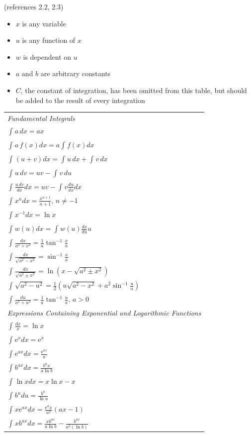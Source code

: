 \documentclass[
]{book}
\providecommand{\tightlist}{%
  \setlength{\itemsep}{0pt}\setlength{\parskip}{0pt}}
\begin{document}
(references 2.2, 2.3)

\begin{itemize}
\tightlist
\item
  \(x\) is any variable
\item
  \(u\) is any function of \(x\)
\item
  \(w\) is dependent on \(u\)
\item
  \(a\) and \(b\) are arbitrary constants
\item
  \(C\), the constant of integration, has been omitted from this table, but
  should be added to the result of every integration
\end{itemize}

\begin{longtable}[]{@{}l@{}}
\toprule
\endhead
\emph{Fundamental Integrals}\tabularnewline
\( \int_{}{} a \, dx = ax \)\tabularnewline
\( \int_{}{} a \, f\left(x\right) dx = a \int_{}{} f\left(x\right) dx \)\tabularnewline
\( \int_{}{} \left(u+v\right) dx = \int_{}{} u\,dx + \int_{}{}v\,dx \)\tabularnewline
\( \int_{}{} u\,dv = uv - \int_{}{}v\,du \)\tabularnewline
\( \int_{}{} \frac{u\,dv}{dx} dx = uv - \int_{}{} v \frac{du}{dx} dx\)\tabularnewline
\( \int_{}{} x^n dx = \frac{x^{n+1}}{n+1} \text{, } n \neq -1\)\tabularnewline
\( \int_{}{} x^{-1} dx = \ln{x}  \)\tabularnewline
\( \int_{}{} w \left( u \right) dx = \int_{}{} w\left( u \right) \frac{dx}{du} u \)\tabularnewline
\( \int_{}{} \frac{dx}{a^2 + x^2} = \frac{1}{a} \tan^{-1} \frac{x}{a} \)\tabularnewline
\( \int_{}{} \frac{dx}{\sqrt{a^2 - x^2}} = \sin^{-1} \frac{x}{a} \)\tabularnewline
\( \int_{}{} \frac{dx}{\sqrt{a^2 \pm x^2}} = \ln \left( x - \sqrt{a^2 \pm x^2} \right) \)\tabularnewline
\( \int_{}{} \sqrt{a^2 - u^2} = \frac{1}{2} \left( u \sqrt{a^2 - x^2} + a^2 \sin^{-1} \frac{u}{a} \right) \)\tabularnewline
\( \int_{}{} \frac{du}{a^2 + u^2} = \frac{1}{a} \tan^{-1} \frac{u}{a} \text{, } a  >  0 \)\tabularnewline
\emph{Expressions Containing Exponential and Logarithmic Functions}\tabularnewline
\( \int_{}{} \frac{dx}{x} = \ln{x} \)\tabularnewline
\( \int_{}{} \mathrm{e}^{x} dx = \mathrm{e}^{x} \)\tabularnewline
\( \int_{}{} \mathrm{e}^{ax} dx = \frac{\mathrm{e}^{ax}}{a} \)\tabularnewline
\( \int_{}{} b^{ax} dx = \frac{b^ax}{a \ln{b}} \)\tabularnewline
\( \int_{}{} \ln{x} dx = x \ln{x} - x \)\tabularnewline
\( \int_{}{} b^{u} du = \frac{b^u}{\ln{u}} \)\tabularnewline
\( \int_{}{} x \mathrm{e}^{ax} dx = \frac{\mathrm{e}^ax}{a^2} \left( ax - 1 \right) \)\tabularnewline
\( \int_{}{} x b^{ax} dx = \frac{x b^{ax}}{a \ln{b} } - \frac{b^{ax}}{a^2 \left( \ln{b} \right) } \)\tabularnewline

\end{longtable}
\end{document}
